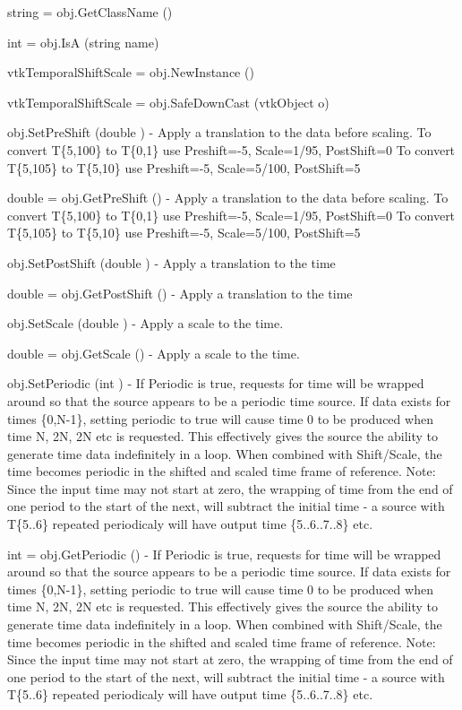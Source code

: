 \begin{DoxyItemize}
\item {\ttfamily string = obj.\-Get\-Class\-Name ()}  
\item {\ttfamily int = obj.\-Is\-A (string name)}  
\item {\ttfamily vtk\-Temporal\-Shift\-Scale = obj.\-New\-Instance ()}  
\item {\ttfamily vtk\-Temporal\-Shift\-Scale = obj.\-Safe\-Down\-Cast (vtk\-Object o)}  
\item {\ttfamily obj.\-Set\-Pre\-Shift (double )} -\/ Apply a translation to the data before scaling. To convert T\{5,100\} to T\{0,1\} use Preshift=-\/5, Scale=1/95, Post\-Shift=0 To convert T\{5,105\} to T\{5,10\} use Preshift=-\/5, Scale=5/100, Post\-Shift=5  
\item {\ttfamily double = obj.\-Get\-Pre\-Shift ()} -\/ Apply a translation to the data before scaling. To convert T\{5,100\} to T\{0,1\} use Preshift=-\/5, Scale=1/95, Post\-Shift=0 To convert T\{5,105\} to T\{5,10\} use Preshift=-\/5, Scale=5/100, Post\-Shift=5  
\item {\ttfamily obj.\-Set\-Post\-Shift (double )} -\/ Apply a translation to the time  
\item {\ttfamily double = obj.\-Get\-Post\-Shift ()} -\/ Apply a translation to the time  
\item {\ttfamily obj.\-Set\-Scale (double )} -\/ Apply a scale to the time.  
\item {\ttfamily double = obj.\-Get\-Scale ()} -\/ Apply a scale to the time.  
\item {\ttfamily obj.\-Set\-Periodic (int )} -\/ If Periodic is true, requests for time will be wrapped around so that the source appears to be a periodic time source. If data exists for times \{0,N-\/1\}, setting periodic to true will cause time 0 to be produced when time N, 2\-N, 2\-N etc is requested. This effectively gives the source the ability to generate time data indefinitely in a loop. When combined with Shift/\-Scale, the time becomes periodic in the shifted and scaled time frame of reference. Note\-: Since the input time may not start at zero, the wrapping of time from the end of one period to the start of the next, will subtract the initial time -\/ a source with T\{5..6\} repeated periodicaly will have output time \{5..6..7..8\} etc.  
\item {\ttfamily int = obj.\-Get\-Periodic ()} -\/ If Periodic is true, requests for time will be wrapped around so that the source appears to be a periodic time source. If data exists for times \{0,N-\/1\}, setting periodic to true will cause time 0 to be produced when time N, 2\-N, 2\-N etc is requested. This effectively gives the source the ability to generate time data indefinitely in a loop. When combined with Shift/\-Scale, the time becomes periodic in the shifted and scaled time frame of reference. Note\-: Since the input time may not start at zero, the wrapping of time from the end of one period to the start of the next, will subtract the initial time -\/ a source with T\{5..6\} repeated periodicaly will have output time \{5..6..7..8\} etc.  

\end{DoxyItemize}
